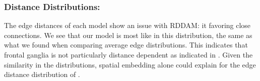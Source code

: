 \subsubsection{Distance Distributions:} The edge distances of each model show an issue with RDDAM: it favoring close connections. We see that our model is most like \ce in this distribution, the same as what we found when comparing average edge distributions. This indicates that \ce frontal ganglia is not particularly distance dependent as indicated in \cite{Itzhack}. Given the similarity in the distributions, spatial embedding alone could explain for the edge distance distribution of \ce. 